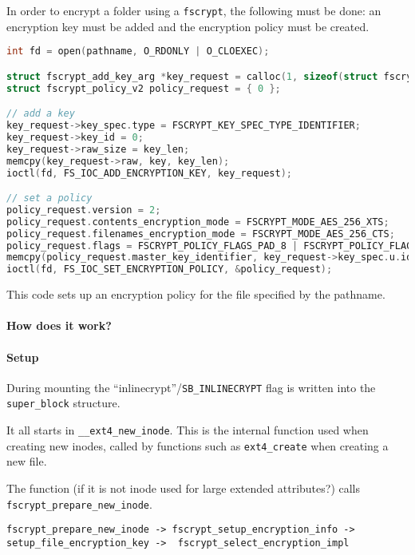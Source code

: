 In order to encrypt a folder using a \verb|fscrypt|, the following must be done: an encryption key must be added and the encryption policy must be created.

\begin{lstlisting}[language=c]
int fd = open(pathname, O_RDONLY | O_CLOEXEC);

struct fscrypt_add_key_arg *key_request = calloc(1, sizeof(struct fscrypt_add_key_arg) + key_len);
struct fscrypt_policy_v2 policy_request = { 0 };

// add a key
key_request->key_spec.type = FSCRYPT_KEY_SPEC_TYPE_IDENTIFIER;
key_request->key_id = 0;
key_request->raw_size = key_len;
memcpy(key_request->raw, key, key_len);
ioctl(fd, FS_IOC_ADD_ENCRYPTION_KEY, key_request);

// set a policy
policy_request.version = 2;
policy_request.contents_encryption_mode = FSCRYPT_MODE_AES_256_XTS;
policy_request.filenames_encryption_mode = FSCRYPT_MODE_AES_256_CTS;
policy_request.flags = FSCRYPT_POLICY_FLAGS_PAD_8 | FSCRYPT_POLICY_FLAGS_PAD_16 | FSCRYPT_POLICY_FLAGS_PAD_32;
memcpy(policy_request.master_key_identifier, key_request->key_spec.u.identifier, FSCRYPT_KEY_IDENTIFIER_SIZE);
ioctl(fd, FS_IOC_SET_ENCRYPTION_POLICY, &policy_request);
\end{lstlisting}

This code sets up an encryption policy for the file specified by the pathname. 

\paragraph{How does it work?}

\paragraph{Setup}

During mounting the ``inlinecrypt''/\verb|SB_INLINECRYPT|  flag is written into the \verb|super_block| structure.

It all starts in \verb|__ext4_new_inode|. This is the internal function used when creating new inodes, called by functions such as \verb|ext4_create| when creating a new file.

The function (if it is not inode used for large extended attributes?) calls \verb|fscrypt_prepare_new_inode|.

\verb|fscrypt_prepare_new_inode -> fscrypt_setup_encryption_info ->| \verb|setup_file_encryption_key ->  fscrypt_select_encryption_impl|

